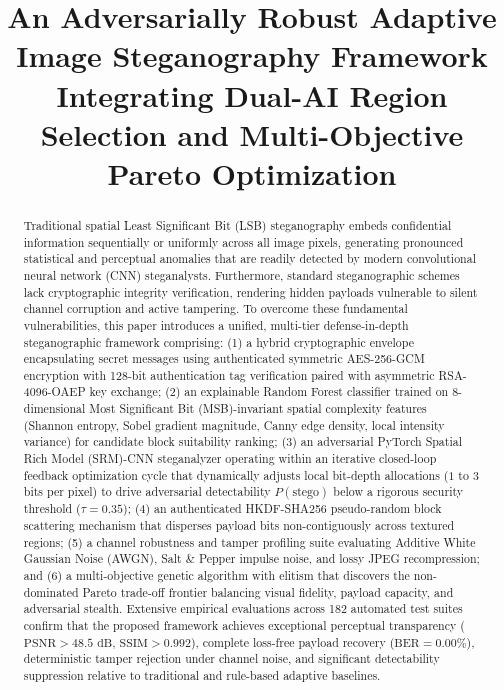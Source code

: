 \documentclass[conference]{IEEEtran}
\begin{document}
\title{An Adversarially Robust Adaptive Image Steganography Framework Integrating Dual-AI Region Selection and Multi-Objective Pareto Optimization}

\author{
}

\maketitle

\begin{abstract}
Traditional spatial Least Significant Bit (LSB) steganography embeds confidential information sequentially or uniformly across all image pixels, generating pronounced statistical and perceptual anomalies that are readily detected by modern convolutional neural network (CNN) steganalysts. Furthermore, standard steganographic schemes lack cryptographic integrity verification, rendering hidden payloads vulnerable to silent channel corruption and active tampering. To overcome these fundamental vulnerabilities, this paper introduces a unified, multi-tier defense-in-depth steganographic framework comprising: (1) a hybrid cryptographic envelope encapsulating secret messages using authenticated symmetric AES-256-GCM encryption with 128-bit authentication tag verification paired with asymmetric RSA-4096-OAEP key exchange; (2) an explainable Random Forest classifier trained on 8-dimensional Most Significant Bit (MSB)-invariant spatial complexity features (Shannon entropy, Sobel gradient magnitude, Canny edge density, local intensity variance) for candidate block suitability ranking; (3) an adversarial PyTorch Spatial Rich Model (SRM)-CNN steganalyzer operating within an iterative closed-loop feedback optimization cycle that dynamically adjusts local bit-depth allocations ($1$ to $3$ bits per pixel) to drive adversarial detectability $P(\text{stego})$ below a rigorous security threshold ($\tau = 0.35$); (4) an authenticated HKDF-SHA256 pseudo-random block scattering mechanism that disperses payload bits non-contiguously across textured regions; (5) a channel robustness and tamper profiling suite evaluating Additive White Gaussian Noise (AWGN), Salt \& Pepper impulse noise, and lossy JPEG recompression; and (6) a multi-objective genetic algorithm with elitism that discovers the non-dominated Pareto trade-off frontier balancing visual fidelity, payload capacity, and adversarial stealth. Extensive empirical evaluations across 182 automated test suites confirm that the proposed framework achieves exceptional perceptual transparency ($\text{PSNR} > 48.5\text{ dB}$, $\text{SSIM} > 0.992$), complete loss-free payload recovery ($\text{BER} = 0.00\%$), deterministic tamper rejection under channel noise, and significant detectability suppression relative to traditional and rule-based adaptive baselines.
\end{abstract}
\end{document}
